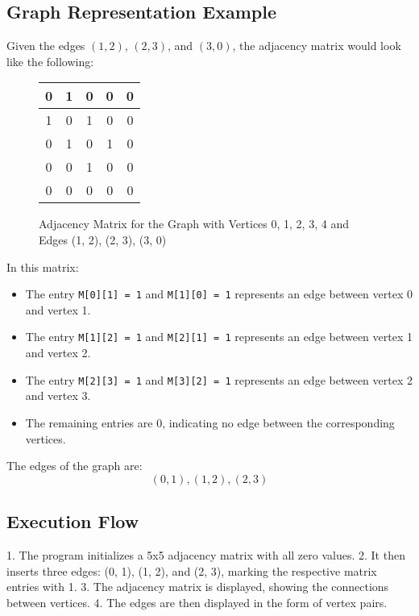 \documentclass{book}
\begin{document}
\subsection{Graph Representation Example}
Given the edges \((1, 2)\), \((2, 3)\), and \((3, 0)\), the adjacency matrix would look like the following:

\begin{figure}[h!]
    \centering
    \begin{tabular}{|c|c|c|c|c|}
    \hline
    0 & 1 & 0 & 0 & 0 \\
    \hline
    1 & 0 & 1 & 0 & 0 \\
    \hline
    0 & 1 & 0 & 1 & 0 \\
    \hline
    0 & 0 & 1 & 0 & 0 \\
    \hline
    0 & 0 & 0 & 0 & 0 \\
    \hline
    \end{tabular}
    \caption{Adjacency Matrix for the Graph with Vertices 0, 1, 2, 3, 4 and Edges (1, 2), (2, 3), (3, 0)}
\end{figure}

In this matrix:
\begin{itemize}
    \item The entry \texttt{M[0][1] = 1} and \texttt{M[1][0] = 1} represents an edge between vertex 0 and vertex 1.
    \item The entry \texttt{M[1][2] = 1} and \texttt{M[2][1] = 1} represents an edge between vertex 1 and vertex 2.
    \item The entry \texttt{M[2][3] = 1} and \texttt{M[3][2] = 1} represents an edge between vertex 2 and vertex 3.
    \item The remaining entries are 0, indicating no edge between the corresponding vertices.
\end{itemize}

The edges of the graph are:
\[
(0, 1), (1, 2), (2, 3)
\]

\subsection{Execution Flow}
1. The program initializes a 5x5 adjacency matrix with all zero values.
2. It then inserts three edges: (0, 1), (1, 2), and (2, 3), marking the respective matrix entries with 1.
3. The adjacency matrix is displayed, showing the connections between vertices.
4. The edges are then displayed in the form of vertex pairs.

\twocolumn
\end{document}
